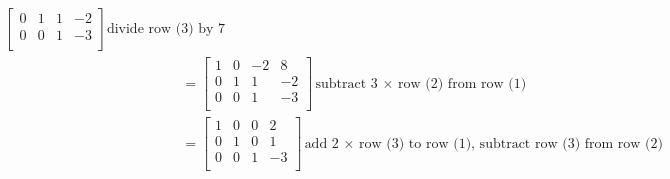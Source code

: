 \documentclass{article}
\theoremstyle{mytheoremstyle}
\theoremstyle{mytheoremstyle}
\theoremstyle{myproblemstyle}
\begin{document}
\begin{align*}
\begin{bmatrix}
            0 & 1 & 1 & -2 \\
            0 & 0 & 1 & -3 \\
        \end{bmatrix} \text{divide row (3) by 7}\\
        &=\begin{bmatrix}
            1 & 0 &-2 & 8 \\
            0 & 1 & 1 & -2 \\
            0 & 0 & 1 & -3 \\
        \end{bmatrix} \text{subtract 3 $\times$ row (2) from row (1)}\\
        &=\begin{bmatrix}
            1 & 0 & 0 & 2 \\
            0 & 1 & 0 & 1 \\
            0 & 0 & 1 & -3 \\
        \end{bmatrix} \text{add 2 $\times$ row (3) to row (1),
                            subtract row (3) from row (2)}\\
    \end{align*}

    \pagebreak
\end{document}
